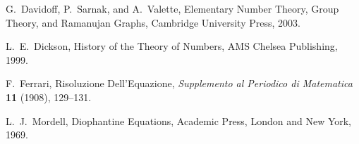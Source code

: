 \documentclass[12pt]{article}
\theoremstyle{definition}
\theoremstyle{remark}
\numberwithin{equation}{section}
\begin{document}
\newpage

\newcommand{\journal}[6]{{\sc #1,} #2, {\it #3} {\bf #4} (#5), #6.}
\newcommand{\preprint}[3]{{\sc #1,} #2, preprint #3.}
\newcommand{\book}[4]{{\sc #1,} #2, #3, #4.}
\newcommand{\collection}[6]{{\sc #1,}  #2, #3, in {\it #4}, #5, #6.}
\newcommand{\JCTA}{J.\ Combin.\ Theory Ser.\ A}
\newcommand{\arxiv}[3]{{\sc #1,} #2, {\tt #3}.}
\newcommand{\article}[3]{{\sc #1,} #2, {\tt #3}.}
\newcommand{\journalfive}[5]{{\sc #1,} #2, {\it #3}  (#4), #5.}





\begin{thebibliography}{1}




\book{G.\ Davidoff, P.\ Sarnak, and A.\ Valette}
         {Elementary Number Theory,
           Group Theory,
           and Ramanujan Graphs}
         {Cambridge University Press}
         {2003}

\book{L.\ E.\ Dickson}
         {History of the Theory of Numbers}
         {AMS Chelsea Publishing}
         {1999}




\journal{F.\ Ferrari}
        {Risoluzione Dell'Equazione}
        {Supplemento al Periodico di Matematica}
        {11}{1908}{129--131}



\book{L.\ J.\ Mordell}
         {Diophantine Equations}
         {Academic Press, London and New York} 
         {1969}

\end{thebibliography}
\end{document}
